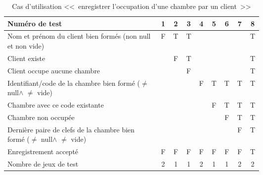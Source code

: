 \documentclass[11pt,article]{article}
\newcommand{\nullvalue}{\textsf{null}\xspace}
\begin{document}
        \begin{table}[htbp!]
            \begin{tabular}{|p{0.6\linewidth}|c|c|c|c|c|c|c|c|}
                \hline
                Numéro de test
                    &1&2&3&4&5&6&7&8\\
                \hline
                \hline
                Nom et prénom du client bien formés (non \nullvalue et non vide)
                    &F&T&T& & & & &T\\
                \hline
                Client existe
                    & &F&T& & & & &T\\
                \hline
                Client occupe aucune chambre
                    & & &F& & & & &T\\
                \hline
                \hline
                Identifiant/code de la chambre bien formé ($\neq$ \nullvalue $\land$ $\neq$ vide)
                    & & & &F&T&T&T&T\\
                \hline
                Chambre avec ce code existante
                    & & & & &F&T&T&T\\
                \hline
                Chambre non occupée
                    & & & & & &F&T&T\\
                \hline
                Dernière paire de clefs de la chambre bien formé ($\neq$ \nullvalue $\land$ $\neq$ vide)
                    & & & & & & &F&T\\
                \hline
                \hline
                Enregistrement accepté
                    &F&F&F&F&F&F&F&T\\
                \hline
                \hline
                Nombre de jeux de test
                                    &2&1&1&2&1&1&2&2 \\
                \hline
            \end{tabular}
            \caption{Cas d'utilisation <<~enregistrer l'occupation d'une chambre par un client~>>}
        \end{table}
\end{document}
